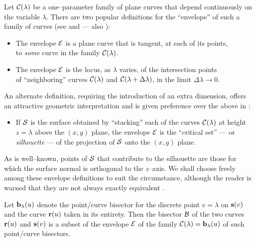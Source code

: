 Let ${\cal C}(\lambda)$ be a one--parameter family of plane curves
that depend continuously on the variable $\lambda$. There are two
popular definitions for the ``envelope'' of such a family of curves
(see \cite[Chapter~4]{boltyanskii64} and \cite[Chapter~5]{fowler29}
--- also \cite{bruce81}):
\begin{itemize}
\item
The envelope ${\cal E}$ is a plane curve that is tangent, at
each of its points, \\ to {\it some\/} curve in the family
${\cal C}(\lambda)$.
\item
The envelope ${\cal E}$ is the locus, as $\lambda$ varies, of
the intersection points \\ of ``neighboring'' curves ${\cal C}
(\lambda)$ and ${\cal C}(\lambda+\Delta\lambda)$, in the limit
$\Delta\lambda \to 0$.
\end{itemize}
An alternate definition, requiring the introduction of an extra
dimension, offers an attractive geometric interpretation and is
given preference over the above in \cite[Chapter~5]{bruce84}:
\begin{itemize}
\item
If ${\cal S}$ is the surface obtained by ``stacking'' each of
the curves ${\cal C}(\lambda)$ at height $z=\lambda$ above the
$(x,y)$ plane, the envelope ${\cal E}$ is the ``critical set''
--- or {\it silhouette\/} --- of the projection of ${\cal S}$
onto the $(x,y)$ plane.
\end{itemize}

As is well--known, points of ${\cal S}$ that contribute to the
silhouette are those for which the surface normal is orthogonal
to the $z$--axis. We shall choose freely among these envelope
definitions to suit the circumstance, although the reader is
warned that they are not always exactly equivalent \cite
{bruce84}.

\begin{propn}
Let ${\bf b}_\lambda(u)$ denote the point/curve bisector for
the discrete point $v=\lambda$ on ${\bf s}(v)$ and the curve
${\bf r}(u)$ taken in its entirety. Then the bisector ${\cal B}$
of the two curves ${\bf r}(u)$ and ${\bf s}(v)$ is a subset of
the envelope ${\cal E}$ of the family ${\cal C}(\lambda)={\bf b}
_\lambda(u)$ of such point/curve bisectors.
\end{propn}

